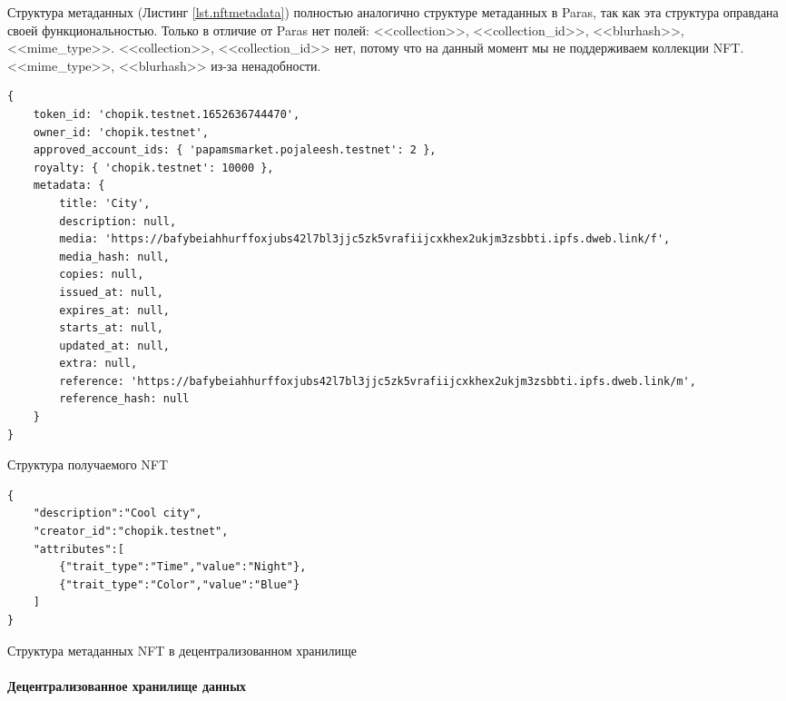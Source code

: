 Структура метаданных (Листинг {\color{blue}\ref{lst.nftmetadata}}) полностью аналогично структуре метаданных в Paras, так как эта структура оправдана своей функциональностью. Только в отличие от Paras нет полей: <<collection>>, <<collection\_id>>, <<blurhash>>, <<mime\_type>>. <<collection>>, <<collection\_id>> нет, потому что на данный момент мы не поддерживаем коллекции NFT. <<mime\_type>>, <<blurhash>> из-за ненадобности.

\begin{listing}
\begin{verbatim}
{
    token_id: 'chopik.testnet.1652636744470',
    owner_id: 'chopik.testnet',
    approved_account_ids: { 'papamsmarket.pojaleesh.testnet': 2 },
    royalty: { 'chopik.testnet': 10000 },
    metadata: {
        title: 'City',
        description: null,
        media: 'https://bafybeiahhurffoxjubs42l7bl3jjc5zk5vrafiijcxkhex2ukjm3zsbbti.ipfs.dweb.link/f',
        media_hash: null,
        copies: null,
        issued_at: null,
        expires_at: null,
        starts_at: null,
        updated_at: null,
        extra: null,
        reference: 'https://bafybeiahhurffoxjubs42l7bl3jjc5zk5vrafiijcxkhex2ukjm3zsbbti.ipfs.dweb.link/m',
        reference_hash: null
    }
}
\end{verbatim}
\caption{Структура получаемого NFT}
\label{lst.nftstructure}
\end{listing}

\begin{listing}
\begin{verbatim}
{
    "description":"Cool city",
    "creator_id":"chopik.testnet",
    "attributes":[
        {"trait_type":"Time","value":"Night"},
        {"trait_type":"Color","value":"Blue"}
    ]
}
\end{verbatim}
\caption{Структура метаданных NFT в децентрализованном хранилище}
\label{lst.nftmetadata}
\end{listing}

\paragraph{Децентрализованное хранилище данных}
\label{section.main.bot.storage}

